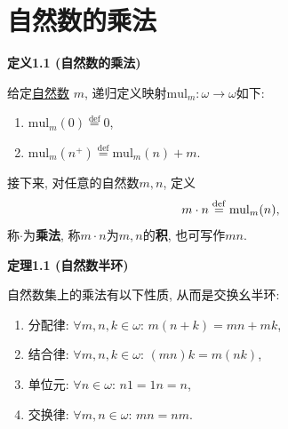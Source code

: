 \documentclass[UTF8]{ctexart}
\begin{document}
\setlength{\abovedisplayskip}{1pt}
\setlength{\belowdisplayskip}{1pt}

\section{自然数的乘法}

\hypertarget{sec:定义1.1}{}
\noindent\textbf{定义1.1 (自然数的乘法)}

给定\href{../01 自然数/01 自然数#nameddest=sec:定义1.3}{自然数} $m$,
递归定义映射$\mathrm{mul}_m:\omega\to\omega$如下:
\begin{enumerate}
    \item $\mathrm{mul}_m(0)\overset{\mathrm{def}}{=}0$,
    \item $\mathrm{mul}_m(n^+)\overset{\mathrm{def}}{=}\mathrm{mul}_m(n)+m$.
\end{enumerate}

接下来, 对任意的自然数$m,n$, 定义
\[
    m\cdot n\overset{\mathrm{def}}{=}\mathrm{mul}_m(n),\\[-3pt]
\]
称$\cdot$为\textbf{乘法}, 称$m\cdot n$为$m,n$的\textbf{积}, 也可写作$mn$.

\vspace{10pt}

\hypertarget{sec:定理1.1}{}
\noindent\textbf{定理1.1 (自然数半环)}

自然数集上的乘法有以下性质, 从而是交换幺半环:
\begin{enumerate}
    \item 分配律: $\forall m,n,k\in\omega:\,m(n+k)=mn+mk$,
    \item 结合律: $\forall m,n,k\in\omega:\,(mn)k=m(nk)$,
    \item 单位元: $\forall n\in\omega:\,n1=1n=n$,
    \item 交换律: $\forall m,n\in\omega:\,mn=nm$.
\end{enumerate}

\end{document}
